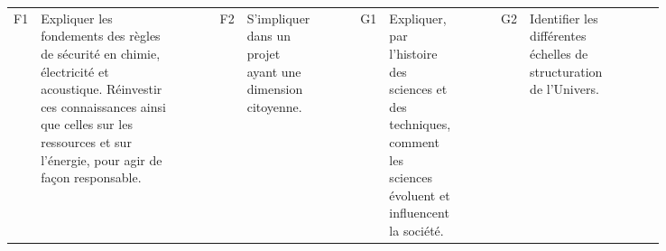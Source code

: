 \documentclass[12pt,a4paper,notitlepage]{article}
\begin{document}
\begin{flushleft}
\begin{tabular}{| m{0.03\linewidth} | m{0.75\linewidth} || m{0.015\linewidth} | m{0.015\linewidth} | m{0.015\linewidth} | m{0.015\linewidth} || }
	F1 & \scriptsize{Expliquer les fondements des règles de sécurité en chimie, électricité et acoustique. Réinvestir ces connaissances ainsi que celles sur les ressources et sur l'énergie, pour agir de façon responsable.} & & & & \cr	\hline
	F2 & \footnotesize{S'impliquer dans un projet ayant une dimension citoyenne.} & & & & \cr	\hline
	G1 & \footnotesize{Expliquer, par l'histoire des sciences et des techniques, comment les sciences évoluent et influencent la société.} & & & & \cr	\hline
	G2 & \footnotesize{Identifier les différentes échelles de structuration de l'Univers.} & & & & \cr \hline
	\hline
\end{tabular}
\end{flushleft}
\end{document}
